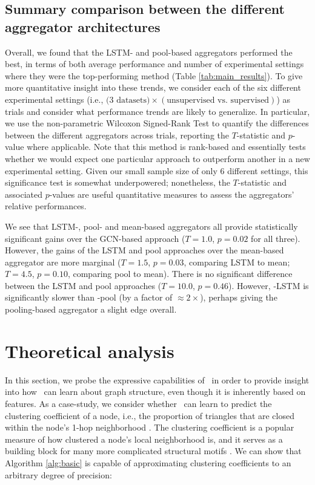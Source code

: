 \subsection{Summary comparison between the different aggregator architectures}\label{inductive:sec:sensitivity}

Overall, we found that the LSTM- and pool-based aggregators performed the best, in terms of both average performance and number of experimental settings where they were the top-performing method (Table \ref{tab:main_results}).
To give more quantitative insight into these trends, we consider each of the six different experimental settings (i.e., $\textrm{(3 datasets)} \times (\textrm{unsupervised vs.\ supervised})$) as trials and consider what performance trends are likely to generalize.
In particular, we use the non-parametric Wilcoxon Signed-Rank Test \cite{siegal1956nonparametric} to quantify the differences between the different aggregators across trials, reporting the $T$-statistic and $p$-value where applicable. 
Note that this method is rank-based and essentially tests whether we would expect one particular approach to outperform another in a new experimental setting.
Given our small sample size of only 6 different settings, this significance test is somewhat underpowered; nonetheless, the $T$-statistic and associated $p$-values are useful quantitative measures to assess the aggregators' relative performances. 

We see that LSTM-, pool- and mean-based aggregators all provide statistically significant gains over the GCN-based approach ($T=1.0$, $p=0.02$ for all three). 
However, the gains of the LSTM and pool approaches over the mean-based aggregator are more marginal ($T=1.5$, $p=0.03$, comparing LSTM to mean; $T=4.5$, $p=0.10$, comparing pool to mean).
There is no significant difference between the LSTM and pool approaches ($T=10.0$, $p=0.46$). 
However, \name-LSTM is significantly slower than \name-pool (by a factor of ${\approx}2{\times}$), perhaps giving the pooling-based aggregator a slight edge overall. 


\section{Theoretical analysis}\label{inductive:sec:theory}

In this section, we probe the expressive capabilities of \name\ in order to 
provide insight into how \name\ can learn about graph structure, even though it is inherently based on features. 
As a case-study, we consider whether \name\ can learn to predict the clustering coefficient of a node, i.e., the proportion of triangles that are closed within the node's 1-hop neighborhood \cite{watts1998collective}.  The clustering coefficient is a popular  measure of how clustered a node's local neighborhood is, and it serves as a building block for many more complicated structural motifs \cite{benson2016higher}. We can show that Algorithm \ref{alg:basic} is capable of approximating clustering coefficients to an arbitrary degree of precision:

